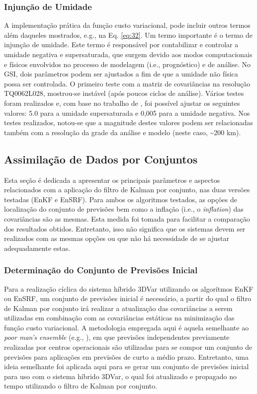 \subsubsection*{Injunção de Umidade}

A implementação prática da função custo variacional, pode incluir outros termos além daqueles mostrados, e.g., na Eq. \ref{eq:32}. Um termo importante é o termo de injunção de umidade. Este termo é responsável por contabilizar e controlar a umidade negativa e supersaturada, que surgem devido aos modos computacionais e físicos envolvidos no processo de modelagem (i.e., prognóstico) e de análise. No GSI, dois parâmetros podem ser ajustados a fim de que a umidade não física possa ser controlada. O primeiro teste com a matriz de covariâncias na resolução TQ0062L028, mostrou-se instável (após poucos ciclos de análise). Vários testes foram realizados e, com base no trabalho de , foi possível ajustar os seguintes valores: 5.0 para a umidade supersaturada e 0,005 para a umidade negativa. Nos testes realizados, notou-se que a magnitude destes valores podem ser relacionadas também com a resolução da grade da análise e modelo (neste caso, \textasciitilde{}200 km).

\subsection{Assimilação de Dados por Conjuntos}

Esta seção é dedicada a apresentar os principais parâmetros e aspectos relacionados com a aplicação do filtro de Kalman por conjunto, nas duas versões testadas (EnKF e EnSRF). Para ambos os algoritmos testados, as opções de localização do conjunto de previsões bem como a inflação (i.e., o \textit{inflation}) das covariâncias são as mesmas. Esta medida foi tomada para facilitar a comparação dos resultados obtidos. Entretanto, isso não significa que os sistemas devem ser realizados com as mesmas opções ou que não há necessidade de se ajustar adequadamente estas.

\subsubsection*{Determinação do Conjunto de Previsões Inicial}

Para a realização cíclica do sistema híbrido 3DVar utilizando os algorítmos EnKF ou EnSRF, um conjunto de previsões inicial é necessário, a partir do qual o filtro de Kalman por conjunto irá realizar a atualização das covariâncias a serem utilizadas em combinação com as covariâncias estáticas na minimização das função custo variacional. A metodologia empregada aqui é aquela semelhante ao \textit{poor man's ensemble} (e.g., ), em que previsões independentes previamente realizadas por centros operacionais são utilizadas para se compor um conjunto de previsões para aplicações em previsões de curto a médio prazo. Entretanto, uma ideia semelhante foi aplicada aqui para se gerar um conjunto de previsões inicial para uso com o sistema híbrido 3DVar, o qual foi atualizado e propagado no tempo utilizando o filtro de Kalman por conjunto.

